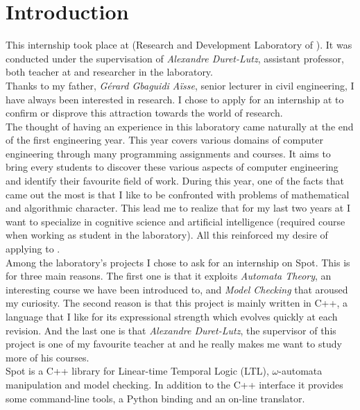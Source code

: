 \chapter{Introduction}

This internship took place at \LRDE\space (Research and Development Laboratory of \EPITA). It was conducted
under the supervisation of \textit{Alexandre Duret-Lutz}, assistant professor, both teacher at \EPITA\space
and researcher in the laboratory.\\

Thanks to my father, \textit{Gérard Gbaguidi Aïsse}, senior lecturer in civil engineering, I have always
been interested in research. I chose to apply for an internship at \LRDE\space to confirm or disprove this 
attraction towards the world of research.\\

The thought of having an experience in this laboratory came naturally at the end of the first
engineering year. This year covers various domains of computer engineering through many programming
assignments and courses. It aims to bring every students to
discover these various aspects of computer engineering and identify their favourite field of work. During
this year, one of the facts that came out the most is that I like to be confronted with problems of
mathematical and algorithmic character. This lead me to realize that for my last two years at \EPITA\space
I want to specialize in cognitive science and artificial intelligence (required course when working as
student in the laboratory). All this reinforced my desire of applying to \LRDE.\\

Among the laboratory's projects I chose to ask for an internship on Spot. This is for three
main reasons. The first one is that it exploits \textit{Automata Theory}, an interesting course we
have been introduced to, and \textit{Model Checking} that aroused my curiosity. The
second reason is that this project is mainly written in C++, a language that I like for its
expressional strength which evolves quickly at each revision. And the last one is that
\textit{Alexandre Duret-Lutz}, the supervisor of this project is one of my favourite teacher at \EPITA\space
and he really makes me want to study more of his courses.\\

Spot is a C++ library for Linear-time Temporal Logic (LTL), $\omega$-automata manipulation and model
checking. In addition to the C++ interface it provides some command-line tools, a Python binding and an
on-line translator.\\

